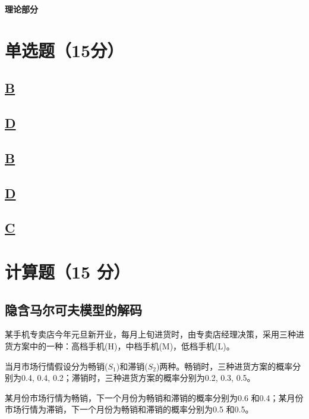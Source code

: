 \documentclass[a4paper]{article}
\begin{document}
\courseheader{}
\vspace{3mm}
\centerline{\textbf{\Large{理论部分}}}

\section{单选题（15分）}
\subsection{\underline{B}}

\subsection{\underline{D}}

\subsection{\underline{B}}

\subsection{\underline{D}}

\subsection{\underline{C}}

\section{计算题（15 分）}
\subsection{隐含马尔可夫模型的解码}

\hspace{2em}某手机专卖店今年元旦新开业，每月上旬进货时，由专卖店经理决策，采用三种进货方案中的一种：高档手机(H)，中档手机(M)，低档手机(L)。

\hspace{2em}当月市场行情假设分为畅销($S_1$)和滞销($S_2$)两种。畅销时，三种进货方案的概率分别为0.4, 0.4, 0.2；滞销时，三种进货方案的概率分别为0.2, 0.3, 0.5。

\hspace{2em}某月份市场行情为畅销，下一个月份为畅销和滞销的概率分别为0.6 和0.4；某月份市场行情为滞销，下一个月份为畅销和滞销的概率分别为0.5 和0.5。
\end{document}
